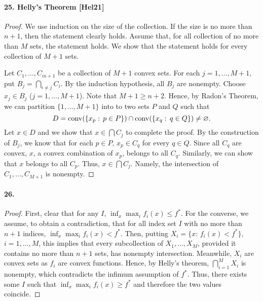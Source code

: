   \paragraph{25. Helly's Theorem [Hel21]}
  \begin{proof}
    We use induction on the size of the collection. If the size is no more
    than $n+1$, then the statement clearly holds. Assume that, for all 
    collection of no more than $M$ sets, the statement holds. We show that the 
    statement holds for every collection of $M+1$ sets.\par
    Let $C_1,\dots,C_{m+1}$ be a collection of $M+1$ convex sets. For each $j=
    1,\dots,M+1$, put $B_j=\bigcap_{i\ne j}C_i$. By the induction hypothesis,
    all $B_j$ are nonempty. Choose $x_j\in B_j$ ($j=1,\dots,M+1$). Note that 
    $M+1\ge n+2$. Hence, by Radon's Theorem, we can partition $\{1,\dots,M+1\}$
    into to two sets $P$ and $Q$ such that
    \[
      D=\operatorname{conv}(\{x_p:\, p\in P\})\cap\operatorname{conv}(\{x_q:\, q\in Q\})\ne\varnothing.
    \]
    Let $x\in D$ and we show that $x\in\bigcap C_j$ to complete the proof. By
    the construction of $B_j$, we know that for each $p\in P$, $x_p\in C_q$ for
    every $q\in Q$. Since all $C_q$ are convex, $x$, a convex combination of 
    $x_p$, belongs to all $C_q$. Similarly, we can show that $x$ belongs to all 
    $C_p$. Thus, $x\in\bigcap C_j$. Namely, the intersection of $C_1,\dots,
    C_{M+1}$ is nonempty.
  \end{proof}
  
  \paragraph{26.}
  \begin{proof}
    First, clear that for any $I$, $\inf_x\max_i f_i(x)\le f^*$. For the 
    converse, we assume, to obtain a contradiction, that for all index set $I$
    with no more than $n+1$ indices, $\inf_x\max_i f_i(x)<f^*$. Then, putting
    $X_i=\{x:\, f_i(x)<f^*\}$, $i=1,\dots,M$, this implies that every 
    subcollection of $X_1,\dots,X_M$, provided it contains no more than $n+1$
    sets, has nonempty intersection. Meanwhile, $X_i$ are convex sets as $f_i$
    are convex functions. Hence, by Helly's theorem, $\bigcap_{i=1}^MX_i$ is
    nonempty, which contradicts the infimum assumption of $f^*$. Thus, there 
    exists some $I$ such that $\inf_x\max_i f_i(x)\ge f^*$ and therefore the
    two values coincide.
  \end{proof}
















